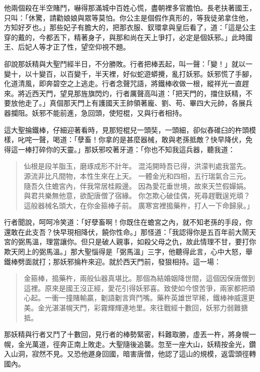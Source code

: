 他兩個殺在半空賭鬥，嚇得那滿城中百姓心慌，盡朝裡多官膽怕。長老扶著國王，只叫：「休驚，請勸娘娘與眾等莫怕。你公主是個假作真形的，等我徒弟拿住他，方知好歹也。」那些妃子有膽大的，把那衣服、釵環拿與皇后看了，道：「這是公主穿的戴的，今都丟下，精著身子，與那和尚在天上爭打，必定是個妖邪。」此時國王、后妃人等才正了性，望空仰視不題。

卻說那妖精與大聖鬥經半日，不分勝敗。行者把棒丟起，叫一聲：「變！」就以一變十，以十變百，以百變千，半天裡，好似蛇遊蟒攪，亂打妖邪。妖邪慌了手腳，化道清風，即奔碧空之上逃走。行者念聲咒語，將鐵棒收做一根，縱祥光一直趕來。將近西天門，望見那旌旗閃灼，行者厲聲高叫道：「把天門的，擋住妖精，不要放他走了。」真個那天門上有護國天王帥領著龐、劉、苟、畢四大元帥，各展兵器攔阻。妖邪不能前進，急回頭，使短棍，又與行者相持。

這大聖掄鐵棒，仔細迎著看時，見那短棍兒一頭奘，一頭細，卻似舂碓臼的杵頭模樣，叱咤一聲，喝道：「孽畜！你拿的是甚麼器械，敢與老孫抵敵？快早降伏，免得這一棒打碎你的天靈。」那妖邪咬著牙道：「你也不知我這兵器，聽我道：
\begin{quote}
仙根是段羊脂玉，磨琢成形不計年。
混沌開時吾已得，洪濛判處我當先。
源流非比凡間物，本性生來在上天。
一體金光和四相，五行瑞氣合三元。
隨吾久住蟾宮內，伴我常居桂殿邊。
因為愛花垂世境，故來天竺假嬋娟。
與君共樂無他意，欲配唐僧了宿緣。
你怎欺心破佳偶，死尋趕戰逞兇頑？
這般器械名頭大，在你金箍棒子前。
廣寒宮裡搗藥杵，打人一下命歸泉。」
\end{quote}

行者聞說，呵呵冷笑道：「好孽畜啊！你既住在蟾宮之內，就不知老孫的手段，你還敢在此支吾？快早現相降伏，饒你性命。」那怪道：「我認得你是五百年前大鬧天宮的弼馬溫，理當讓你。但只是破人親事，如殺父母之仇，故此情理不甘，要打你欺天罔上的弼馬溫。」那大聖惱得是「弼馬溫」三字，他聽得此言，心中大怒，舉鐵棒劈面就打；那妖邪掄杵來迎。就於西天門前，發狠相持。這一場：
\begin{quote}
金箍棒，搗藥杵，兩般仙器真堪比。那個為結婚姻降世間，這個因保唐僧到這裡。原來是國王沒正經，愛花引得妖邪喜。致使如今恨苦爭，兩家都把頑心起。一衝一撞賭輸贏，劖語劖言齊鬥嘴。藥杵英雄世罕稀，鐵棒神威還更美。金光湛湛幌天門，彩霧輝輝連地里。來往戰經十數回，妖邪力弱難搪抵。
\end{quote}

那妖精與行者又鬥了十數回，見行者的棒勢緊密，料難取勝，虛丟一杵，將身幌一幌，金光萬道，徑奔正南上敗走。大聖隨後追襲。忽至一座大山，妖精按金光，鑽入山洞，寂然不見。又恐他遯身回國，暗害唐僧，他認了這山的規模，返雲頭徑轉國內。

